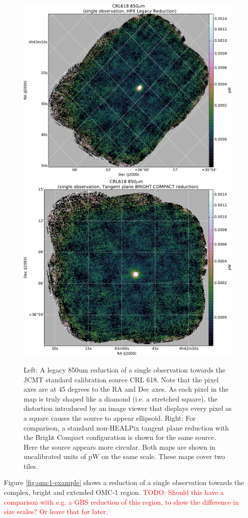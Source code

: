 \documentclass[usenatbib]{mnras}
\newcommand{\todo}[1]{\textcolor{red}{TODO: #1}}
\begin{document}
\begin{figure}
  \centering
  \includegraphics[width=0.45\linewidth]{crl618_example_legacyred}
  \includegraphics[width=0.45\linewidth]{crl618_example_bcred}
  \caption{Left: A legacy 850um reduction of a single observation
    towards the JCMT standard calibration source CRL 618. Note that
    the pixel axes are at 45 degrees to the RA and Dec axes. As each
    pixel in the map is truly shaped like a diamond (i.e. a stretched
    square), the distortion introduced by an image viewer that
    displays every pixel as a square causes the source to appear
    ellipsoid. Right: For comparison, a standard non-HEALPix tangent
    plane reduction with the Bright Compact configuration is shown for
    the same source. Here the source appears more circular. Both maps
    are shown in uncalibrated units of pW on the same scale. These
    maps cover two tiles.}
  \label{fig:crl618-example}
\end{figure}


Figure \ref{fig:omc1-example} shows a reduction of a single
observation towards the complex, bright and extended OMC-1
region. \todo{ Should this have a comparison with e.g. a GBS
  reduction of this region, to show the difference in size scales? Or leave that for later}.
\end{document}
